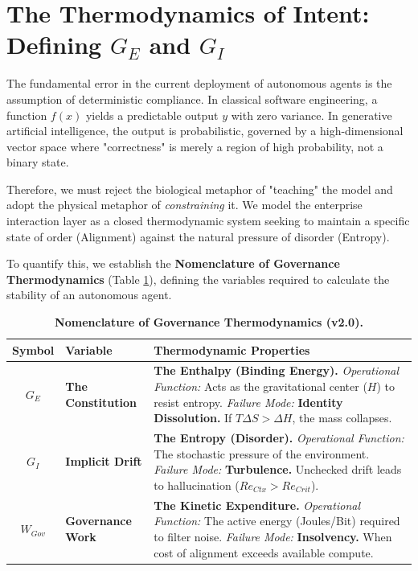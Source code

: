 \documentclass[11pt, a4paper]{article}
\newcommand{\Ge}{G_E}
\newcommand{\Gi}{G_I}
\newcommand{\Wgov}{W_{Gov}}
\newcommand{\ReCtx}{Re_{Ctx}}
\begin{document}
\section{The Thermodynamics of Intent: Defining $\Ge$ and $\Gi$}
\label{sec:thermodynamics}

The fundamental error in the current deployment of autonomous agents is the assumption of deterministic compliance. In classical software engineering, a function $f(x)$ yields a predictable output $y$ with zero variance. In generative artificial intelligence, the output is probabilistic, governed by a high-dimensional vector space where "correctness" is merely a region of high probability, not a binary state.

Therefore, we must reject the biological metaphor of "teaching" the model and adopt the physical metaphor of \textit{constraining} it. We model the enterprise interaction layer as a closed thermodynamic system seeking to maintain a specific state of order (Alignment) against the natural pressure of disorder (Entropy).

To quantify this, we establish the \textbf{Nomenclature of Governance Thermodynamics} (Table \ref{tab:nomenclature}), defining the variables required to calculate the stability of an autonomous agent.

\begin{table}[H]
\centering
\caption{\textbf{Nomenclature of Governance Thermodynamics (v2.0).}}
\label{tab:nomenclature}
\renewcommand{\arraystretch}{1.5}
\begin{tabularx}{\textwidth}{@{}c l X@{}}
\toprule
\textbf{Symbol} & \textbf{Variable} & \textbf{Thermodynamic Properties} \\
\midrule
$\Ge$ & \textbf{The Constitution} & \textbf{The Enthalpy (Binding Energy).} \newline
\textit{Operational Function:} Acts as the gravitational center ($H$) to resist entropy. \newline
\textit{Failure Mode:} \textbf{Identity Dissolution.} If $T\Delta S > \Delta H$, the mass collapses. \\
\midrule
$\Gi$ & \textbf{Implicit Drift} & \textbf{The Entropy (Disorder).} \newline
\textit{Operational Function:} The stochastic pressure of the environment. \newline
\textit{Failure Mode:} \textbf{Turbulence.} Unchecked drift leads to hallucination ($\ReCtx > Re_{Crit}$). \\
\midrule
$\Wgov$ & \textbf{Governance Work} & \textbf{The Kinetic Expenditure.} \newline
\textit{Operational Function:} The active energy (Joules/Bit) required to filter noise. \newline
\textit{Failure Mode:} \textbf{Insolvency.} When cost of alignment exceeds available compute. \\
\bottomrule
\end{tabularx}
\end{table}
\end{document}

